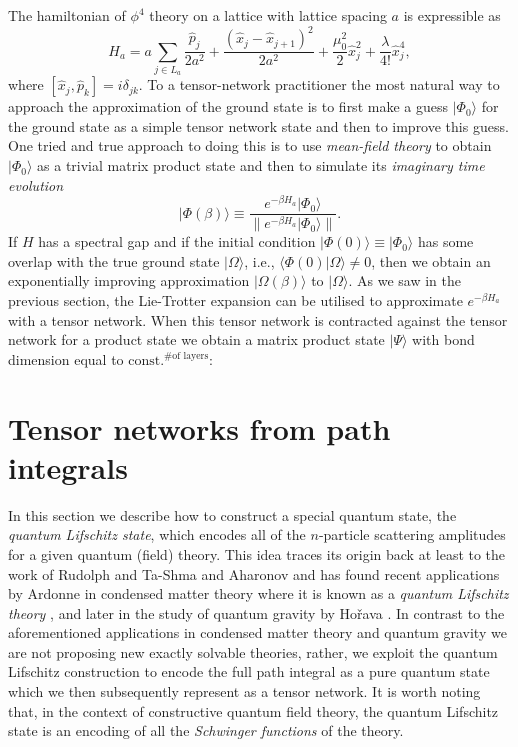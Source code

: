 \documentclass[twocolumn,lengthcheck,superscriptaddress]{revtex4-1}
\theoremstyle{definition}
\theoremstyle{remark}
\begin{document}
The hamiltonian of $\phi^4$ theory on a lattice with lattice spacing $a$ is expressible as 
\begin{equation}
	H_a = a\sum_{j\in L_a} \frac{\widehat{p}_j}{2a^{2}} + \frac{(\widehat{x}_j-\widehat{x}_{j+1})^2}{2a^2} + \frac{\mu_0^2}{2} \widehat{x}_j^2 + \frac{\lambda}{4!} \widehat{x}_j^4,
\end{equation}
where $[\widehat{x}_j, \widehat{p}_k] = i\delta_{jk}$. To a tensor-network practitioner the most natural way to approach the approximation of the ground state is to first make a guess $|\Phi_0\rangle$ for the ground state as a simple tensor network state and then to improve this guess. One tried and true approach to doing this is to use \emph{mean-field theory} to obtain $|\Phi_0\rangle$ as a trivial matrix product state and then to simulate its \emph{imaginary time evolution} 
\begin{equation}
	|\Phi(\beta)\rangle \equiv \frac{e^{-\beta H_a}|\Phi_0\rangle}{\|e^{-\beta H_a}|\Phi_0\rangle\|}.
\end{equation}
If $H$ has a spectral gap and if the initial condition $|\Phi(0)\rangle \equiv |\Phi_0\rangle$ has some overlap with the true ground state $|\Omega\rangle$, i.e., $\langle \Phi(0)|\Omega\rangle \not= 0$, then we obtain an exponentially improving approximation $|\Omega(\beta)\rangle$ to $|\Omega\rangle$.
As we saw in the previous section, the Lie-Trotter expansion can be utilised to approximate $e^{-\beta H_a}$  with a tensor network. When this tensor network is contracted against the tensor network for a product state we obtain a matrix product state $|\Psi\rangle$ with bond dimension equal to $\text{const.}^{\text{\# of layers}}$:


\section{Tensor networks from path integrals}
In this section we describe how to construct a special quantum state, the \emph{quantum Lifschitz state}, which encodes all of the $n$-particle scattering amplitudes for a given quantum (field) theory. This idea traces its origin back at least to the work of Rudolph and Ta-Shma and Aharonov \cite{rudolph:2002a, aharonov:2003a} and has found recent applications by Ardonne in condensed matter theory where it is known as a \emph{quantum Lifschitz theory} \cite{ardonne:2004a}, and later in the study of quantum gravity by Ho\v{r}ava \cite{horava:2009a,horava:2008a}. In contrast to the aforementioned applications in condensed matter theory and quantum gravity we are not proposing new exactly solvable theories, rather, we exploit the quantum Lifschitz construction to encode the full path integral as a pure quantum state which we then subsequently represent as a tensor network. It is worth noting that, in the context of constructive quantum field theory, the quantum Lifschitz state is an encoding of all the \emph{Schwinger functions} of the theory.  
\end{document}
